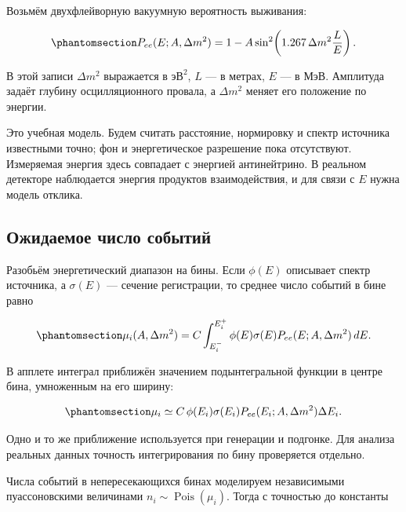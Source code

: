 \documentclass[
  russian,
  11pt,
  a4paper,
  open=any]{scrbook}
\begin{document}
Возьмём двухфлейворную вакуумную вероятность выживания:

\begin{equation}\protect\phantomsection\label{eq-ch10-reactor-survival}{
P_{ee}(E;A,\Delta m^2)
=1-A\sin^2\!\left(1.267\,\Delta m^2\frac LE\right).
}\end{equation}

В этой записи \(\Delta m^2\) выражается в \(\text{эВ}^2\), \(L\) --- в
метрах, \(E\) --- в МэВ. Амплитуда задаёт глубину осцилляционного
провала, а \(\Delta m^2\) меняет его положение по энергии.

Это учебная модель. Будем считать расстояние, нормировку и спектр
источника известными точно; фон и энергетическое разрешение пока
отсутствуют. Измеряемая энергия здесь совпадает с энергией антинейтрино.
В реальном детекторе наблюдается энергия продуктов взаимодействия, и для
связи с \(E\) нужна модель отклика.

\subsection{Ожидаемое число
событий}\label{ux43eux436ux438ux434ux430ux435ux43cux43eux435-ux447ux438ux441ux43bux43e-ux441ux43eux431ux44bux442ux438ux439}

Разобьём энергетический диапазон на бины. Если \(\phi(E)\) описывает
спектр источника, а \(\sigma(E)\) --- сечение регистрации, то среднее
число событий в бине равно

\begin{equation}\protect\phantomsection\label{eq-ch10-reactor-bin-integral}{
\mu_i(A,\Delta m^2)
=C\int_{E_i^-}^{E_i^+}
\phi(E)\sigma(E)P_{ee}(E;A,\Delta m^2)\,dE.
}\end{equation}

В апплете интеграл приближён значением подынтегральной функции в центре
бина, умноженным на его ширину:

\begin{equation}\protect\phantomsection\label{eq-ch10-reactor-midpoint-model}{
\mu_i\simeq C\,\phi(E_i)\sigma(E_i)
P_{ee}(E_i;A,\Delta m^2)\Delta E_i.
}\end{equation}

Одно и то же приближение используется при генерации и подгонке. Для
анализа реальных данных точность интегрирования по бину проверяется
отдельно.

Числа событий в непересекающихся бинах моделируем независимыми
пуассоновскими величинами \(n_i\sim\operatorname{Pois}(\mu_i)\). Тогда с
точностью до константы
\end{document}
